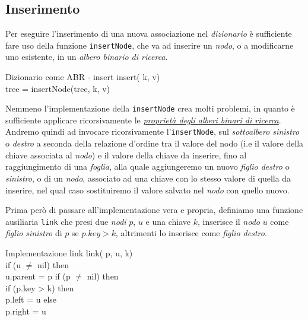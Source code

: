 \subsection{Inserimento}
Per eseguire l'inserimento di una nuova associazione nel \emph{dizionario} è
sufficiente fare uso della funzione \texttt{insertNode}, che va ad inserire un
\emph{nodo}, o a modificarne uno esistente, in un \emph{albero binario di
ricerca}.
\begin{minicode}{Dizionario come ABR - insert}
    \ind insert( k,  v)\\
        \indf tree = insertNode(tree, k, v)\\
\end{minicode}\noindent
Nemmeno l'implementazione della \texttt{insertNode} crea molti problemi, in quanto
è sufficiente applicare ricorsivamente le \hyperref[def:44]{\emph{proprietà degli
alberi binari di ricerca}}. Andremo quindi ad invocare ricorsivamente
l'\texttt{insertNode}, sul \emph{sottoalbero sinistro} o \emph{destro} a seconda
della relazione d'ordine tra il valore del nodo (i.e il valore della chiave
associata al \emph{nodo}) e il valore della chiave da inserire, fino al
raggiungimento di una \emph{foglia}, alla quale aggiungeremo un nuovo \emph{figlio
destro} o \emph{sinistro}, o di un \emph{nodo}, associato ad una chiave con lo
stesso valore di quella da inserire, nel qual caso sostituiremo il valore
salvato nel \emph{nodo} con quello nuovo.

Prima però di passare all'implementazione vera e propria, definiamo una
funzione ausiliaria \texttt{link} che presi due \emph{nodi} $p$, $u$ e una
chiave $k$, inserisce il \emph{nodo} $u$ come \emph{figlio sinistro} di $p$ se
$p.key > k$, altrimenti lo inserisce come \emph{figlio destro}.

\begin{minicode}{Implementazione link}
    \ind link( p,  u,  k)\\
        \indf if (u $\neq$ nil) then\\
            u.parent = p\hfill{}
        \indf if (p $\neq$ nil) then\\
            \indff if (p.key > k) then\\
                p.left = u\hfill{}
            \indff else\\
                p.right = u\hfill{}
\end{minicode}


